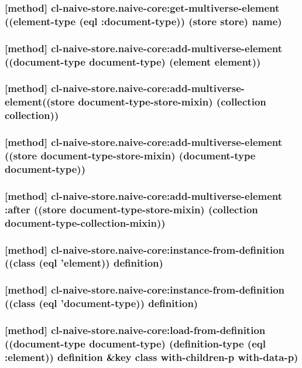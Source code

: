 \documentclass[11pt]{article}
\begin{document}
\subsubsection{[method] cl-naive-store.naive-core:get-multiverse-element ((element-type (eql :document-type)) (store store) name)}
\label{sec:org47d887a}

\subsubsection{[method] cl-naive-store.naive-core:add-multiverse-element ((document-type document-type) (element element))}
\label{sec:org758f48a}

\subsubsection{[method] cl-naive-store.naive-core:add-multiverse-element((store document-type-store-mixin) (collection collection))}
\label{sec:org3d03425}

\subsubsection{[method] cl-naive-store.naive-core:add-multiverse-element ((store document-type-store-mixin) (document-type document-type))}
\label{sec:orge064d7c}

\subsubsection{[method] cl-naive-store.naive-core:add-multiverse-element :after ((store document-type-store-mixin) (collection document-type-collection-mixin))}
\label{sec:org3d5cfce}

\subsubsection{[method] cl-naive-store.naive-core:instance-from-definition ((class (eql 'element)) definition)}
\label{sec:org6141ec1}

\subsubsection{[method] cl-naive-store.naive-core:instance-from-definition ((class (eql 'document-type)) definition)}
\label{sec:org4863d20}

\subsubsection{[method] cl-naive-store.naive-core:load-from-definition ((document-type document-type) (definition-type (eql :element)) definition \&key class with-children-p with-data-p)}
\label{sec:org8422b9f}
\end{document}
